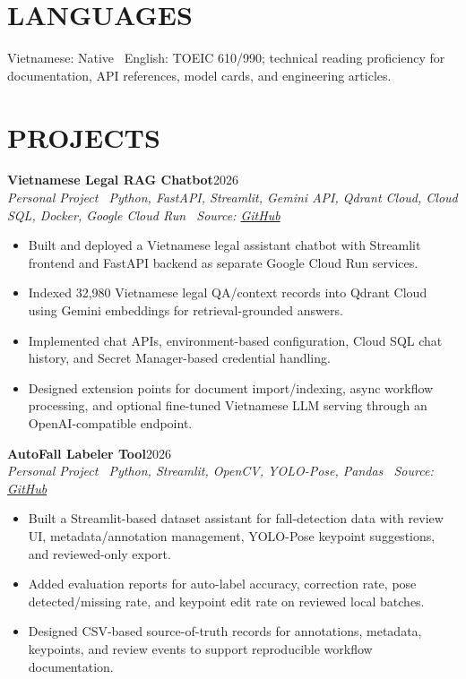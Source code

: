 \documentclass[10pt,a4paper]{article}
\newenvironment{cvitems}{%
    \begin{itemize}[leftmargin=1.1em,itemsep=0pt,topsep=0pt,parsep=0pt]
}{%
    \end{itemize}
}
\newcommand{\entryhead}[2]{%
    \noindent\textbf{#1}\hfill #2\\[-2pt]
}
\newcommand{\entrysub}[1]{%
    \noindent\textit{#1}\\[-1pt]
}
\begin{document}
\section{LANGUAGES}
Vietnamese: Native \textbar\ English: TOEIC 610/990; technical reading proficiency for documentation, API references, model cards, and engineering articles.

\section{PROJECTS}
\entryhead{Vietnamese Legal RAG Chatbot}{2026}
\entrysub{Personal Project \textbar\ Python, FastAPI, Streamlit, Gemini API, Qdrant Cloud, Cloud SQL, Docker, Google Cloud Run \textbar\ Source: \href{https://github.com/NguyenKhacBao564/legal_RaG_Chatbot_VietNamese-System}{GitHub}}
\begin{cvitems}
    \item Built and deployed a Vietnamese legal assistant chatbot with Streamlit frontend and FastAPI backend as separate Google Cloud Run services.
    \item Indexed 32,980 Vietnamese legal QA/context records into Qdrant Cloud using Gemini embeddings for retrieval-grounded answers.
    \item Implemented chat APIs, environment-based configuration, Cloud SQL chat history, and Secret Manager-based credential handling.
    \item Designed extension points for document import/indexing, async workflow processing, and optional fine-tuned Vietnamese LLM serving through an OpenAI-compatible endpoint.
\end{cvitems}

\entryhead{AutoFall Labeler Tool}{2026}
\entrysub{Personal Project \textbar\ Python, Streamlit, OpenCV, YOLO-Pose, Pandas \textbar\ Source: \href{https://github.com/NguyenKhacBao564/autofall-labeler-tool}{GitHub}}
\begin{cvitems}
    \item Built a Streamlit-based dataset assistant for fall-detection data with review UI, metadata/annotation management, YOLO-Pose keypoint suggestions, and reviewed-only export.
    \item Added evaluation reports for auto-label accuracy, correction rate, pose detected/missing rate, and keypoint edit rate on reviewed local batches.
    \item Designed CSV-based source-of-truth records for annotations, metadata, keypoints, and review events to support reproducible workflow documentation.
\end{cvitems}
\end{document}
